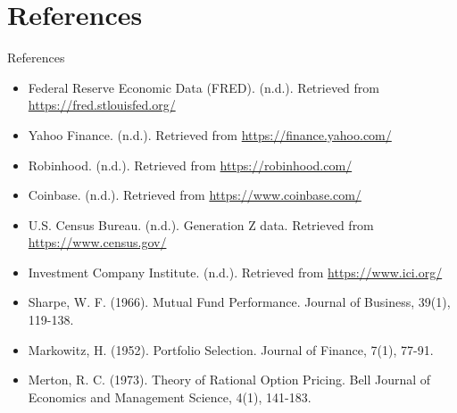 \documentclass{beamer}
\begin{document}
\section{References}
\begin{frame}{References}
    \begin{itemize}
        \item Federal Reserve Economic Data (FRED). (n.d.). Retrieved from \url{https://fred.stlouisfed.org/}
        \item Yahoo Finance. (n.d.). Retrieved from \url{https://finance.yahoo.com/}
        \item Robinhood. (n.d.). Retrieved from \url{https://robinhood.com/}
        \item Coinbase. (n.d.). Retrieved from \url{https://www.coinbase.com/}
        \item U.S. Census Bureau. (n.d.). Generation Z data. Retrieved from \url{https://www.census.gov/}
        \item Investment Company Institute. (n.d.). Retrieved from \url{https://www.ici.org/}
        \item Sharpe, W. F. (1966). Mutual Fund Performance. Journal of Business, 39(1), 119-138.
        \item Markowitz, H. (1952). Portfolio Selection. Journal of Finance, 7(1), 77-91.
        \item Merton, R. C. (1973). Theory of Rational Option Pricing. Bell Journal of Economics and Management Science, 4(1), 141-183.
    \end{itemize}
\end{frame}
\end{document}

